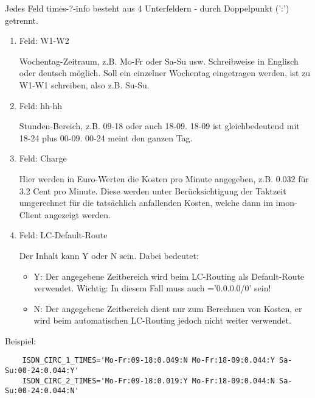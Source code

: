 \begin{description}
  
  Jedes Feld times-?-info besteht aus 4 Unterfeldern - durch
  Doppelpunkt (':') getrennt.
  \begin{enumerate}
  \item Feld: W1-W2
    
    Wochentag-Zeitraum, z.B. Mo-Fr oder Sa-Su usw. Schreibweise in
    Englisch oder deutsch möglich. Soll ein einzelner Wochentag
    eingetragen werden, ist zu W1-W1 schreiben, also z.B. Su-Su.
    
  \item Feld: hh-hh
    
    Stunden-Bereich, z.B. 09-18 oder auch 18-09. 18-09 ist
    gleichbedeutend mit 18-24 plus 00-09. 00-24 meint den ganzen Tag.

  \item  Feld: Charge
    
    Hier werden in Euro-Werten die Kosten pro Minute angegeben, z.B.
    0.032 für 3.2 Cent pro Minute. Diese werden unter Berücksichtigung
    der Taktzeit umgerechnet für die tatsächlich anfallenden Kosten,
    welche dann im imon-Client angezeigt werden.

    
  \item  Feld: LC-Default-Route
    
    Der Inhalt kann Y oder N sein. Dabei bedeutet:

    \begin{itemize}
    \item Y: Der angegebene Zeitbereich wird beim LC-Routing als
      Default-Route verwendet. Wichtig: In diesem Fall muss auch
      ='0.0.0.0/0' sein!
        
    \item N: Der angegebene Zeitbereich dient nur zum Berechnen von
      Kosten, er wird beim automatischen LC-Routing jedoch nicht
      weiter verwendet.
    \end{itemize}

  \end{enumerate}

    Beispiel:

\begin{small}
\begin{example}
\begin{verbatim}
    ISDN_CIRC_1_TIMES='Mo-Fr:09-18:0.049:N Mo-Fr:18-09:0.044:Y Sa-Su:00-24:0.044:Y'
    ISDN_CIRC_2_TIMES='Mo-Fr:09-18:0.019:Y Mo-Fr:18-09:0.044:N Sa-Su:00-24:0.044:N'
\end{verbatim}
\end{example}
\end{small}
    

\end{description}
